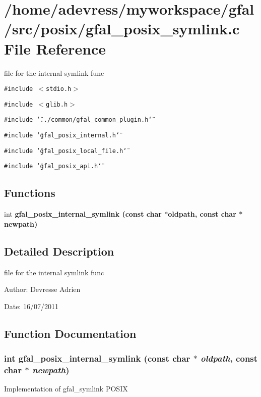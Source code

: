 \section{/home/adevress/myworkspace/gfal/src/posix/gfal\_\-posix\_\-symlink.c File Reference}
\label{gfal__posix__symlink_8c}
file for the internal symlink func 

{\tt \#include $<$stdio.h$>$}\par
{\tt \#include $<$glib.h$>$}\par
{\tt \#include \char`\"{}../common/gfal\_\-common\_\-plugin.h\char`\"{}}\par
{\tt \#include \char`\"{}gfal\_\-posix\_\-internal.h\char`\"{}}\par
{\tt \#include \char`\"{}gfal\_\-posix\_\-local\_\-file.h\char`\"{}}\par
{\tt \#include \char`\"{}gfal\_\-posix\_\-api.h\char`\"{}}\par
\subsection*{Functions}
\begin{CompactItemize}
\item 
int \bf{gfal\_\-posix\_\-internal\_\-symlink} (const char $\ast$oldpath, const char $\ast$newpath)
\end{CompactItemize}


\subsection{Detailed Description}
file for the internal symlink func 

\begin{Desc}
\item[Author:]Devresse Adrien \end{Desc}
\begin{Desc}
\item[Date:]16/07/2011 \end{Desc}


\subsection{Function Documentation}
\subsubsection{\setlength{\rightskip}{0pt plus 5cm}int gfal\_\-posix\_\-internal\_\-symlink (const char $\ast$ {\em oldpath}, const char $\ast$ {\em newpath})}\label{gfal__posix__symlink_8c_dc9e646bbdc504844fab47bdcb1699f0}


Implementation of gfal\_\-symlink POSIX 